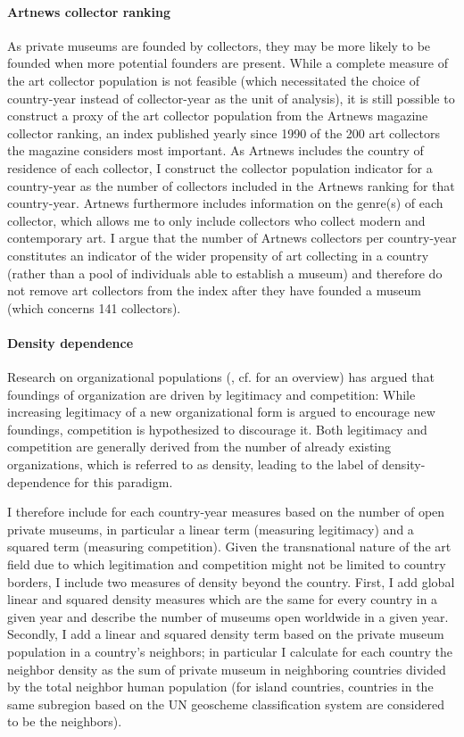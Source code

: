 \documentclass[11pt]{article}
\begin{document}
\paragraph*{Artnews collector ranking}

As private museums are founded by collectors, they may be more likely to be founded when more potential founders are present.
While a complete measure of the art collector population is not feasible (which necessitated the choice of country-year instead of collector-year as the unit of analysis), it is still possible to construct a proxy of the art collector population from the Artnews magazine collector ranking, an index published yearly since 1990 of the 200 art collectors the magazine considers most important.
As Artnews includes the country of residence of each collector, I construct the collector population indicator for a country-year as the number of collectors included in the Artnews ranking for that country-year.
Artnews furthermore includes information on the genre(s) of each collector, which allows me to only include collectors who collect modern and contemporary art.
I argue that the number of Artnews collectors per country-year constitutes an indicator of the wider propensity of art collecting in a country (rather than a pool of individuals able to establish a museum) and therefore do not remove art collectors from the index after they have founded a museum (which concerns 141 collectors).



\paragraph*{Density dependence}

Research on organizational populations (\cite{Hannan_1992_dynamics}, cf. \cite{Carroll_Khessina_2019_demography} for an overview) has argued that foundings of organization are driven by legitimacy and competition:
While increasing legitimacy of a new organizational form is argued to encourage new foundings, competition is hypothesized to discourage it.
Both legitimacy and competition are generally derived from the number of already existing organizations, which is referred to as density, leading to the label of density-dependence for this paradigm. 


I therefore include for each country-year measures based on the number of open private museums, in particular a linear term (measuring legitimacy) and a squared term (measuring competition).
Given the transnational nature of the art field due to which legitimation and competition might not be limited to country borders, I include two measures of density beyond the country.
First, I add global linear and squared density measures which are the same for every country in a given year and describe the number of museums open worldwide in a given year.
Secondly, I add a linear and squared density term based on the private museum population in a country's neighbors; in particular I calculate for each country the neighbor density as the sum of private museum in neighboring countries divided by the total neighbor human population (for island countries, countries in the same subregion based on the UN geoscheme classification system are considered to be the neighbors). 
\end{document}
